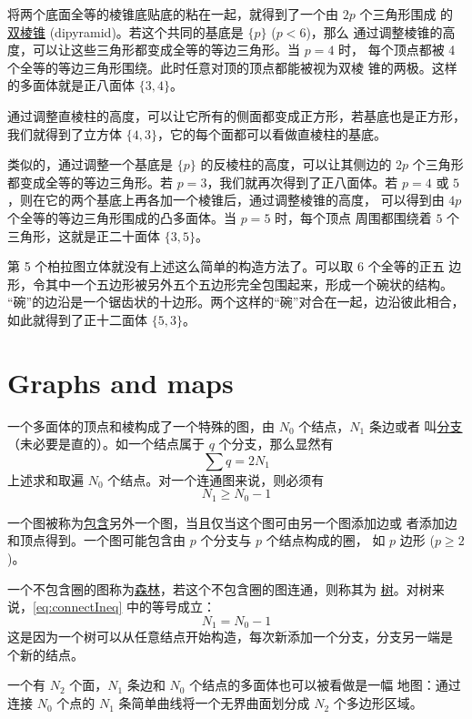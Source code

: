 \documentclass[cs4size,a4paper,adobefonts,openany]{ctexbook}
\newcommand{\pname}[1]{\underline{#1}}
\numberwithin{equation}{section}
\begin{document}
将两个底面全等的棱锥底贴底的粘在一起，就得到了一个由 $2p$ 个三角形围成
的\pname{双棱锥} (dipyramid)。若这个共同的基底是 $\{p\}$ ($p<6$)，那么
通过调整棱锥的高度，可以让这些三角形都变成全等的等边三角形。当 $p=4$ 时，
每个顶点都被 4 个全等的等边三角形围绕。此时任意对顶的顶点都能被视为双棱
锥的两极。这样的多面体就是正八面体 $\{3,4\}$。

通过调整直棱柱的高度，可以让它所有的侧面都变成正方形，若基底也是正方形，
我们就得到了立方体 $\{4,3\}$，它的每个面都可以看做直棱柱的基底。

类似的，通过调整一个基底是 $\{p\}$ 的反棱柱的高度，可以让其侧边的 $2p$
个三角形都变成全等的等边三角形。若 $p=3$，我们就再次得到了正八面体。若
$p=4$ 或 $5$，则在它的两个基底上再各加一个棱锥后，通过调整棱锥的高度，
可以得到由 $4p$ 个全等的等边三角形围成的凸多面体。当 $p=5$ 时，每个顶点
周围都围绕着 $5$ 个三角形，这就是正二十面体 $\{3,5\}$。

第 5 个柏拉图立体就没有上述这么简单的构造方法了。可以取 6 个全等的正五
边形，令其中一个五边形被另外五个五边形完全包围起来，形成一个碗状的结构。
“碗”的边沿是一个锯齿状的十边形。两个这样的“碗”对合在一起，边沿彼此相合，
如此就得到了正十二面体 $\{5,3\}$。

\section{Graphs and maps}
一个多面体的顶点和棱构成了一个特殊的图，由 $N_0$ 个结点，$N_1$ 条边或者
叫\pname{分支}（未必要是直的）。如一个结点属于 $q$ 个分支，那么显然有
\begin{equation}
  \label{eq:sumQ}
  \sum q = 2N_1
\end{equation}
上述求和取遍 $N_0$ 个结点。对一个连通图来说，则必须有
\begin{equation}
  \label{eq:connectIneq}
  N_1\geq N_0-1
\end{equation}

一个图被称为\pname{包含}另外一个图，当且仅当这个图可由另一个图添加边或
者添加边和顶点得到。一个图可能包含由 $p$ 个分支与 $p$ 个结点构成的圈，
如 $p$ 边形 ($p\geq 2$)。

一个不包含圈的图称为\pname{森林}，若这个不包含圈的图连通，则称其为
\pname{树}。对树来说，\eqref{eq:connectIneq} 中的等号成立：
\begin{equation}
  N_1=N_0-1
\end{equation}
这是因为一个树可以从任意结点开始构造，每次新添加一个分支，分支另一端是
个新的结点。

一个有 $N_2$ 个面，$N_1$ 条边和 $N_0$ 个结点的多面体也可以被看做是一幅
地图：通过连接 $N_0$ 个点的 $N_1$ 条简单曲线将一个无界曲面划分成 $N_2$
个多边形区域。
\end{document}
